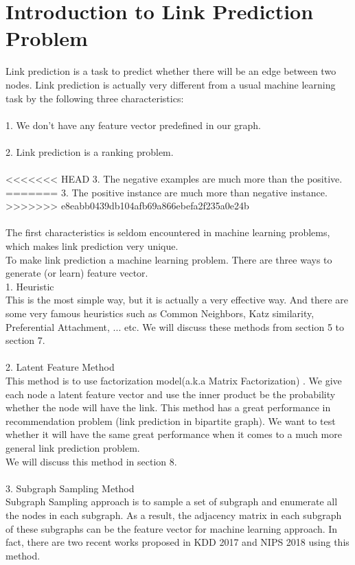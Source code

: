 \documentclass[12pt]{article}
\begin{document}
\section{Introduction to Link Prediction Problem}
Link prediction is a task to predict whether there will be an edge between two nodes. Link prediction is actually very different from a usual machine learning task by the following three characteristics:
\\ \\
1. We don't have any feature vector predefined in our graph. 
\\ \\
2. Link prediction is a ranking problem.
\\ \\
<<<<<<< HEAD
3. The negative examples are much more than the positive. 
=======
3. The positive instance are much more than negative instance. 
>>>>>>> e8eabb0439db104afb69a866ebefa2f235a0e24b
\\  \\
The first characteristics is seldom encountered in machine learning problems, which makes link prediction very unique.  \\
To make link prediction a machine learning problem. There are three ways to generate (or learn) feature vector. \\
1. Heuristic \\ 
This is the most simple way, but it is actually a very effective way. And there are some very famous heuristics such as Common Neighbors, Katz similarity, Preferential Attachment, ... etc.  We will discuss these methods from section 5 to section 7. \\ \\
2. Latent Feature Method \\
This method is to use factorization model(a.k.a Matrix Factorization) \cite{mf}. We give each node a latent feature vector and use the inner product be the probability whether the node will have the link. This method has a great performance in recommendation problem (link prediction in bipartite graph). We want to test whether it will have the same great performance when it comes to a much more general link prediction problem. 
\\
We will discuss this method in section 8.
\\ \\
3. Subgraph Sampling Method \\ 
Subgraph Sampling approach is to sample a set of subgraph and enumerate all the nodes in each subgraph. As a result, the adjacency matrix in each subgraph of these subgraphs can be the feature vector for machine learning approach. In fact, there are two recent works proposed in KDD 2017 \cite{lp2017} and NIPS 2018 \cite{lp2018} using this method. 
\end{document}
